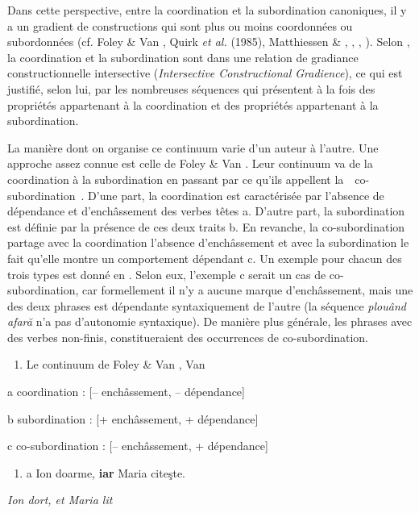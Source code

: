 Dans cette perspective, entre la coordination et la subordination canoniques, il y a un gradient de constructions qui sont plus ou moins coordonnées ou subordonnées (cf. Foley \& Van \citet{Valin1984}, Quirk \textit{et al.} (1985), Matthiessen \& \citet{Thompson1988}, \citet{Lehmann1988}, \citet{Cristofaro2003}, \citet{Cosme2008}). Selon \citet{Aarts2007}, la coordination et la subordination sont dans une relation de gradiance constructionnelle intersective (\textit{Intersective Constructional Gradience}), ce qui est justifié, selon lui, par les nombreuses séquences qui présentent à la fois des propriétés appartenant à la coordination et des propriétés appartenant à la subordination. 

La manière dont on organise ce continuum varie d'un auteur à l'autre. Une approche assez connue est celle de Foley \& Van \citet{Valin1984}. Leur continuum va de la coordination à la subordination en passant par ce qu'ils appellent la~{\guillemotleft}~co-subordination~{\guillemotright}. D'une part, la coordination est caractérisée par l'absence de dépendance et d'enchâssement des verbes têtes a. D'autre part, la subordination est définie par la présence de ces deux traits b. En revanche, la co-subordination partage avec la coordination l'absence d'enchâssement et avec la subordination le fait qu'elle montre un comportement dépendant c. Un exemple pour chacun des trois types est donné en . Selon eux, l'exemple c serait un cas de co-subordination, car formellement il n'y a aucune marque d'enchâssement, mais une des deux phrases est dépendante syntaxiquement de l'autre (la séquence \textit{plouând afară} n'a pas d'autonomie syntaxique). De manière plus générale, les phrases avec des verbes non-finis, constitueraient des occurrences de co-subordination.  


\begin{enumerate}
\item \label{bkm:Ref300150231}Le continuum de Foley \& Van \citet{Valin1984}, Van \citet{Valin2005}~


\end{enumerate}
  a  coordination :   [-- enchâssement, -- dépendance]  

  b  subordination :   [+ enchâssement, + dépendance]

  c  co-subordination :   [-- enchâssement, + dépendance]


\begin{enumerate}
\item \label{bkm:Ref300150652}a  Ion doarme, \textbf{iar} Maria citeşte.  


\end{enumerate}
{\itshape
Ion dort, et Maria lit}

